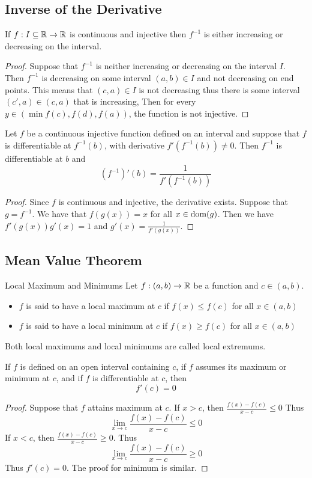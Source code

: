\documentclass[a4paper]{article}
\begin{document}
\subsection{Inverse of the Derivative}
\begin{thm}{}{} If $f:I\subseteq\mathbb{R}\to\mathbb{R}$ is continuous and injective then $f^{-1}$ is either increasing or decreasing on the interval. \tcbline
\begin{proof} Suppose that $f^{-1}$ is neither increasing or decreasing on the interval $I$. Then $f^{-1}$ is decreasing on some interval $(a,b)\in I$ and not decreasing on end points. This means that $(c,a)\in I$ is not decreasing thus there is some interval $(c',a)\in(c,a)$ that is increasing, Then for every $y\in(\min{f(c),f(d)},f(a))$, the function is not injective. 
\end{proof}
\end{thm}

\begin{thm}{}{} Let $f$ be a continuous injective function defined on an interval and suppose that $f$ is differentiable at $f^{-1}(b)$, with derivative $f'\left(f^{-1}(b)\right)\neq0$. Then $f^{-1}$ is differentiable at $b$ and $$\left(f^{-1}\right)'(b)=\frac{1}{f'\left(f^{-1}(b)\right)}$$ \tcbline
\begin{proof} Since $f$ is continuous and injective, the derivative exists. Suppose that $g=f^{-1}$. We have that $f(g(x))=x$ for all $x\in\operatorname{dom}(g)$. Then we have $f'(g(x))g'(x)=1$ and $g'(x)=\frac{1}{f'(g(x))}$. 
\end{proof}
\end{thm}

\subsection{Mean Value Theorem}
\begin{defn}{Local Maximum and Minimums}{} Let $f:(a,b)\to\mathbb{R}$ be a function and $c\in(a,b)$. 
\begin{itemize}
\item $f$ is said to have a local maximum at $c$ if $f(x)\leq f(c)$ for all $x\in(a,b)$
\item $f$ is said to have a local minimum at $c$ if $f(x)\geq f(c)$ for all $x\in(a,b)$
\end{itemize}
Both local maximums and local minimums are called local extremums. 
\end{defn}

\begin{thm}{}{} If $f$ is defined on an open interval containing $c$, if $f$ assumes its maximum or minimum at $c$, and if $f$ is differentiable at $c$, then $$f'(c)=0$$ \tcbline
\begin{proof} Suppose that $f$ attains maximum at $c$. If $x>c$, then $\frac{f(x)-f(c)}{x-c}\leq 0$ Thus $$\lim_{x\to c}\frac{f(x)-f(c)}{x-c}\leq 0$$ If $x<c$, then $\frac{f(x)-f(c)}{x-c}\geq 0$. Thus $$\lim_{x\to c}\frac{f(x)-f(c)}{x-c}\geq 0$$ Thus $f'(c)=0$. The proof for minimum is similar. 
\end{proof}
\end{thm}
\end{document}
